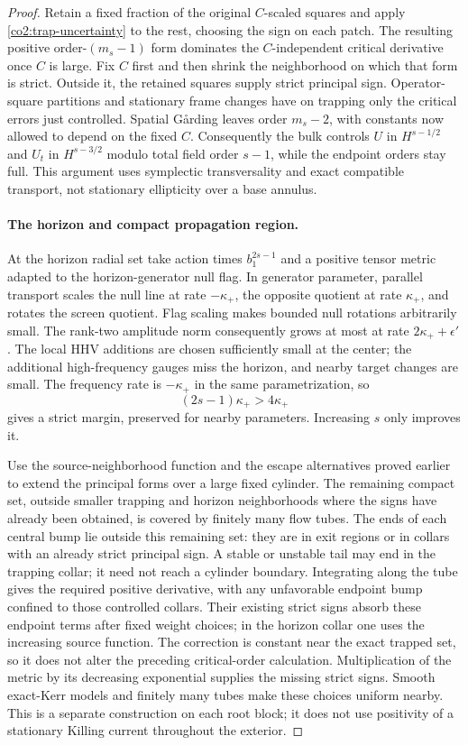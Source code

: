 \begin{proof}
Retain a fixed fraction of the original $C$-scaled squares and apply
\eqref{co2:trap-uncertainty} to the rest, choosing the sign on each patch.
The resulting positive order-$(m_s-1)$ form dominates the $C$-independent
critical derivative once $C$ is large.  Fix $C$ first and then shrink the
neighborhood on which that form is strict.  Outside it, the retained squares
supply strict principal sign.  Operator-square partitions and stationary
frame changes have on trapping only the critical errors just controlled.
Spatial G\aa rding leaves order $m_s-2$, with constants now allowed to
depend on the fixed $C$.
Consequently the bulk controls $U$ in $H^{s-1/2}$ and $U_t$ in
$H^{s-3/2}$ modulo total field order $s-1$, while the endpoint orders stay
full.  This argument uses symplectic transversality and exact compatible
transport, not stationary ellipticity over a base annulus.

\paragraph{The horizon and compact propagation region.}
At the horizon radial set take action times $b_1^{2s-1}$ and a positive
tensor metric adapted to the horizon-generator null flag.  In generator
parameter, parallel transport scales the null line at rate $-\kappa_+$,
the opposite quotient at rate $\kappa_+$, and rotates the screen quotient.
Flag scaling makes bounded null rotations arbitrarily small.  The rank-two
amplitude norm consequently grows at most at rate $2\kappa_++\epsilon'$.
The local HHV additions are chosen sufficiently small at the center; the
additional high-frequency gauges miss the horizon, and nearby target changes
are small.  The frequency rate is $-\kappa_+$ in the same parametrization,
so
\[
 (2s-1)\kappa_+>4\kappa_+
\]
gives a strict margin, preserved for nearby parameters.  Increasing $s$ only
improves it.

Use the source-neighborhood function and the escape alternatives proved
earlier to extend the principal forms over a large fixed cylinder.  The
remaining compact set, outside smaller trapping and horizon neighborhoods
where the signs have
already been obtained, is covered by finitely many flow tubes.  The ends of
each central bump lie outside this remaining set: they are in exit regions
or in collars with an already strict principal sign.  A stable or unstable
tail may end in the trapping collar; it need not reach a cylinder boundary.
Integrating along the tube gives the required positive derivative, with any
unfavorable endpoint bump confined to those controlled collars.  Their
existing strict signs absorb these endpoint terms after fixed weight choices;
in the horizon collar one uses the increasing source function.
The correction is constant near the exact trapped set, so it does not alter
the preceding critical-order calculation.  Multiplication of the metric by
its decreasing exponential supplies the missing strict signs.  Smooth exact-Kerr models and
finitely many tubes make these choices uniform nearby.  This is a separate
construction on each root block; it does not use positivity of a stationary
Killing current throughout the exterior.


\end{proof}
